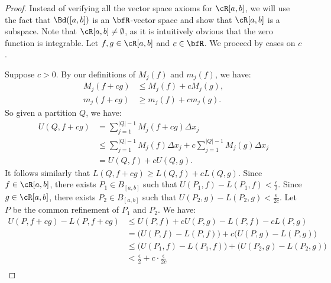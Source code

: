 \documentclass[10pt,twoside,openany]{memoir}
\begin{document}
        \begin{proof}
            Instead of verifying all the vector space axioms for $\cR[a,b]$, we will use the fact that $\Bd([a,b])$ is an $\bfR$-vector space and show that $\cR[a,b]$ is a subspace. Note that $\cR[a,b] \neq \emptyset$, as it is intuitively obvious that the zero function is integrable. Let $f,g \in \cR[a,b]$ and $c \in \bfR$. We proceed by cases on $c$.
            
            Suppose $c > 0$. By our definitions of $M_j(f)$ and $m_j(f)$, we have:
                \begin{equation*}
                \begin{split}
                    M_j(f+cg) &\leq M_j(f) + cM_j(g), \\
                    m_j(f+cg) &\geq m_j(f) + cm_j(g).
                \end{split}
                \end{equation*}
            So given a partition $Q$, we have:
                \begin{equation*}
                \begin{split}
                    U(Q,f+cg)
                    & = \sum_{j = 1}^{|Q|-1}M_j(f+cg)\Delta x_j \\
                    & \leq \sum_{j = 1}^{|Q|-1}M_j(f)\Delta x_j+c\sum_{j = 1}^{|Q|-1}M_j(g)\Delta x_j \\
                    & = U(Q,f) + cU(Q,g).
                \end{split}
                \end{equation*}
            It follows similarly that $L(Q,f+cg) \geq L(Q,f) + cL(Q,g)$. Since $f \in \cR[a,b]$, there exists $P_1 \in B_{[a,b]}$ such that $U(P_1,f) - L(P_1,f) < \frac{\epsilon}{2}$. Since $g \in \cR[a,b]$, there exists $P_2 \in B_{[a,b]}$ such that $U(P_2,g) - L(P_2,g) < \frac{\epsilon}{2c}$. Let $P$ be the common refinement of $P_1$ and $P_2$. We have:
                \begin{equation*}
                \begin{split}
                    U(P,f+cg) - L(P,f+cg) 
                    & \leq U(P,f) + cU(P,g) - L(P,f) - cL(P,g) \\
                    & = \bigl(U(P,f) - L(P,f)\bigr) + c \bigl(U(P,g) - L(P,g)\bigr) \\
                    & \leq \bigl(U(P_1,f) - L(P_1,f)\bigr) + \bigl(U(P_2,g) - L(P_2,g)\bigr) \\
                    & < \frac{\epsilon}{2} + c\cdot\frac{\epsilon}{2c} \\

\end{split}
\end{equation*}
\end{proof}
\end{document}
